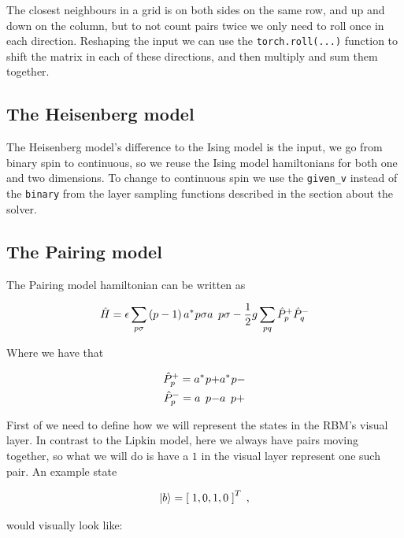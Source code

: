 The closest neighbours in a grid is on both sides on the same row, and up and down on the column, but to not count pairs twice we only need to roll once in each direction. Reshaping the input we can use the \texttt{torch.roll(...)} function to shift the matrix in each of these directions, and then multiply and sum them together.

\subsection{The Heisenberg model}

The Heisenberg model's difference to the Ising model is the input, we go from binary spin to continuous, so we reuse the Ising model hamiltonians for both one and two dimensions. To change to continuous spin we use the \texttt{given_v} instead of the \texttt{binary} from the layer sampling functions described in the section about the solver.

\subsection{The Pairing model}

 The Pairing model hamiltonian can be written as

\begin{equation}
  \hat{H} = \epsilon \sum_{p\sigma} \left(p-1\right)\hc{a}{p\sigma}\op{a}{p\sigma} - \frac{1}{2}g\sum_{pq}\hat{P}_p^+\hat{P}_q^-
  \label{eq:Pairing_model_imp}
\end{equation}

Where we have that

\begin{equation*}
  \begin{gathered}
    \hat{P}_p^+ = \hc{a}{p+}\hc{a}{p-}\\
    \hat{P}_p^- = \op{a}{p-}\op{a}{p+}
  \end{gathered}
\end{equation*}

First of we need to define how we will represent the states in the RBM's visual layer. In contrast to the Lipkin model, here we always have pairs moving together, so what we will do is have a $1$ in the visual layer represent one such pair. An example state

$$\ket{b} = \left[\;1, 0, 1, 0 \; \right]^T \; ,$$

would visually look like:

